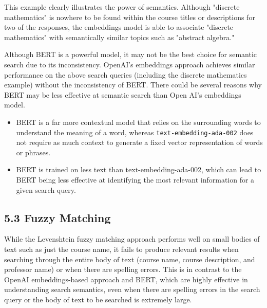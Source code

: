 \documentclass[
	a4paper, %
	10pt, %
	unnumberedsections, %
	twoside, %
]{LTJournalArticle}
\begin{document}
This example clearly illustrates the power of semantics. Although "discrete mathematics" is nowhere to be found within the course titles or descriptions for two of the responses, the embeddings model is able to associate "discrete mathematics" with semantically similar topics such as "abstract algebra." 

Although BERT is a powerful model, it may not be the best choice for semantic search due to its inconsistency. OpenAI's embeddings approach achieves similar performance on the above search queries (including the discrete mathematics example) without the inconsistency of BERT. There could be several reasons why BERT may be less effective at semantic search than Open AI's embeddings model. 

\begin{itemize}
	\item  BERT is a far more contextual model that relies on the surrounding words to understand the meaning of a word, whereas \texttt{text-embedding-ada-002} does not require as much context to generate a fixed vector representation of words or phrases. 
	\item BERT is trained on less text than text-embedding-ada-002, which can lead to BERT being less effective at identifying the most relevant information for a given search query.
\end{itemize}

\subsection{5.3 Fuzzy Matching}


While the Levenshtein fuzzy matching approach performs well on small bodies of text such as just the course name, it fails to produce relevant results when searching through the entire body of text (course name, course description, and professor name) or when there are spelling errors. This is in contrast to the OpenAI embeddings-based approach and BERT, which are highly effective in understanding search semantics, even when there are spelling errors in the search query or the body of text to be searched is extremely large. 
\end{document}
